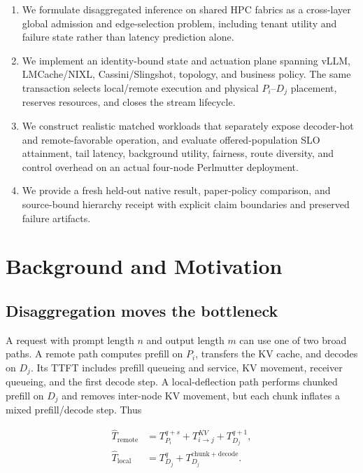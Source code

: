 \documentclass[10pt,twocolumn]{article}
\begin{document}
\begin{enumerate}
  \item We formulate disaggregated inference on shared HPC fabrics as a
  cross-layer global admission and edge-selection problem, including tenant
  utility and failure state rather than latency prediction alone.
  \item We implement an identity-bound state and actuation plane spanning
  vLLM, LMCache/NIXL, Cassini/Slingshot, topology, and business policy.  The
  same transaction selects local/remote execution and physical $P_i$--$D_j$
  placement, reserves resources, and closes the stream lifecycle.
  \item We construct realistic matched workloads that separately expose
  decoder-hot and remote-favorable operation, and evaluate offered-population
  SLO attainment, tail latency, background utility, fairness, route diversity,
  and control overhead on an actual four-node Perlmutter deployment.
  \item We provide a fresh held-out native result, paper-policy comparison,
  and source-bound hierarchy receipt with explicit claim boundaries and
  preserved failure artifacts.
\end{enumerate}

\section{Background and Motivation}

\subsection{Disaggregation moves the bottleneck}

A request with prompt length $n$ and output length $m$ can use one of two broad
paths.  A remote path computes prefill on $P_i$, transfers the KV cache, and
decodes on $D_j$.  Its TTFT includes prefill queueing and service, KV movement,
receiver queueing, and the first decode step.  A local-deflection path performs
chunked prefill on $D_j$ and removes inter-node KV movement, but each chunk
inflates a mixed prefill/decode step.  Thus

\begin{align}
\widehat{T}_{\mathrm{remote}} &= T_{P_i}^{q+s} + T_{i\rightarrow j}^{KV}
                               + T_{D_j}^{q+1}, \\
\widehat{T}_{\mathrm{local}}  &= T_{D_j}^{q} + T_{D_j}^{\mathrm{chunk+decode}}.
\end{align}
\end{document}
